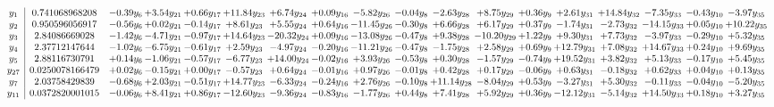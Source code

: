 \documentclass[9pt]{article}
\begin{document}
\[\begin{array}{c| c c@{\hskip 2pt} c@{\hskip 2pt} c@{\hskip 2pt} c@{\hskip 2pt} c@{\hskip 2pt} c@{\hskip 2pt} c@{\hskip 2pt} c@{\hskip 2pt} c@{\hskip 2pt} c@{\hskip 2pt} c@{\hskip 2pt} c@{\hskip 2pt} c@{\hskip 2pt} c@{\hskip 2pt} c@{\hskip 2pt} c@{\hskip 2pt} }
 y_{1}   &  0.741068968208 & -0.39 y_{6} & +  3.54 y_{21} & +  0.66 y_{17} & + 11.84 y_{23} & +  6.74 y_{24} & +  0.09 y_{16} & -5.82 y_{26} & -0.04 y_{8} & -2.63 y_{28} & +  8.75 y_{29} & +  0.36 y_{9} & +  2.61 y_{31} & + 14.84 y_{32} & -7.35 y_{33} & -0.43 y_{10} & -3.97 y_{35}\\
 y_{2}   &  0.950596056917 & -0.56 y_{6} & +  0.02 y_{21} & -0.14 y_{17} & +  8.61 y_{23} & +  5.55 y_{24} & +  0.64 y_{16} & -11.45 y_{26} & -0.30 y_{8} & +  6.66 y_{28} & +  6.17 y_{29} & +  0.37 y_{9} & -1.74 y_{31} & -2.73 y_{32} & -14.15 y_{33} & +  0.05 y_{10} & + 10.22 y_{35}\\
 y_{3}   &  2.84086669028 & -1.42 y_{6} & -4.71 y_{21} & -0.97 y_{17} & + 14.64 y_{23} & -20.32 y_{24} & +  0.09 y_{16} & -13.08 y_{26} & -0.47 y_{8} & +  9.38 y_{28} & -10.20 y_{29} & +  1.22 y_{9} & +  9.30 y_{31} & +  7.73 y_{32} & -3.97 y_{33} & -0.29 y_{10} & +  5.32 y_{35}\\
 y_{4}   &  2.37712147644 & -1.02 y_{6} & -6.75 y_{21} & -0.61 y_{17} & +  2.59 y_{23} & -4.97 y_{24} & -0.20 y_{16} & -11.21 y_{26} & -0.47 y_{8} & -1.75 y_{28} & +  2.58 y_{29} & +  0.69 y_{9} & + 12.79 y_{31} & +  7.08 y_{32} & + 14.67 y_{33} & +  0.24 y_{10} & +  9.69 y_{35}\\
 y_{5}   &  2.88116730791 & +  0.14 y_{6} & -1.06 y_{21} & -0.57 y_{17} & -6.77 y_{23} & + 14.00 y_{24} & -0.02 y_{16} & +  3.93 y_{26} & -0.53 y_{8} & +  0.30 y_{28} & -1.57 y_{29} & -0.74 y_{9} & + 19.52 y_{31} & +  3.82 y_{32} & +  5.13 y_{33} & -0.17 y_{10} & +  5.45 y_{35}\\
 y_{27}   &  0.0250078166479 & +  0.02 y_{6} & -0.15 y_{21} & +  0.00 y_{17} & -0.57 y_{23} & +  0.64 y_{24} & -0.01 y_{16} & +  0.97 y_{26} & -0.01 y_{8} & +  0.42 y_{28} & +  0.17 y_{29} & -0.06 y_{9} & +  0.63 y_{31} & -0.18 y_{32} & +  0.62 y_{33} & +  0.04 y_{10} & +  0.13 y_{35}\\
 y_{7}   &  2.03758429839 & -0.68 y_{6} & +  2.03 y_{21} & -0.51 y_{17} & + 14.77 y_{23} & -6.33 y_{24} & -0.24 y_{16} & +  2.76 y_{26} & -0.10 y_{8} & + 11.14 y_{28} & -8.04 y_{29} & +  0.53 y_{9} & -3.27 y_{31} & +  5.30 y_{32} & -0.11 y_{33} & -0.04 y_{10} & -5.20 y_{35}\\
 y_{11}   &  0.0372820001015 & -0.06 y_{6} & +  8.41 y_{21} & +  0.86 y_{17} & -12.60 y_{23} & -9.36 y_{24} & -0.83 y_{16} & -1.77 y_{26} & +  0.44 y_{8} & +  7.41 y_{28} & +  5.92 y_{29} & +  0.36 y_{9} & -12.12 y_{31} & -5.14 y_{32} & + 14.50 y_{33} & +  0.18 y_{10} & +  3.27 y_{35}\\

\end{array}\]
\end{document}
